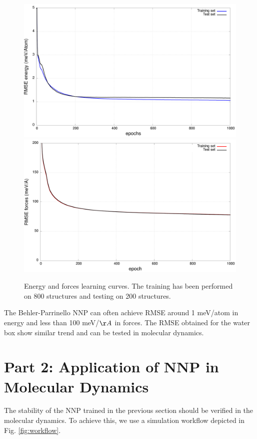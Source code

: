 \documentclass[12pt]{article}
\begin{document}
\begin{figure}
    \centering
    \includegraphics[scale=0.2]{latex_files/energy.png}
    \includegraphics[scale=0.2]{latex_files/forces.png}
    \caption{Energy and forces learning curves. The training has been performed on 800 structures and testing on 200 structures.}
    \label{fig:my_label}
\end{figure}

The Behler-Parrinello NNP can often achieve RMSE around 1 meV/atom in energy and  less than 100 meV/$\AA$ in forces. The RMSE obtained for the water box show similar trend and can be tested in molecular dynamics.

\newpage
{}
\section{Part 2: Application of NNP in Molecular Dynamics}
The stability of the NNP trained in the previous section should be verified in the molecular dynamics. To achieve this, we use a simulation workflow depicted in Fig. \ref{fig:workflow}. 
\end{document}
